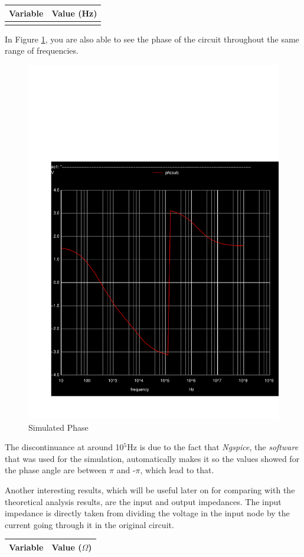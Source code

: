 \begin{center}
\begin{tabular}{|l|r|}
  \hline    
  {\bf Variable} & {\bf Value (Hz)} \\ \hline
  
  \label{tab:freq-tab}
\end{tabular}
\end{center}

In Figure \ref{fig:sim-phase}, you are also able to see the phase of the circuit throughout the same range of frequencies.

\begin{figure}[H] \centering
\includegraphics[width=0.5\linewidth]{../sim/phase.pdf}
\caption{Simulated Phase}
\label{fig:sim-phase}
\end{figure}

The discontinuance at around 10$^5$Hz is due to the fact that \textit{Ngspice}, the \textit{software} that was used for the simulation, automatically makes it so the values showed for the phase angle are between $\pi$ and -$\pi$, which lead to that. 

Another interesting results, which will be useful later on for comparing with the theoretical analysis results, are the input and output impedances. The input impedance is directly taken from dividing the voltage in the input node by the current going through it in the original circuit.

\begin{center}
\begin{tabular}{|l|r|}
  \hline    
  {\bf Variable} & {\bf Value ($\Omega$)} \\ \hline
  
\end{tabular}
\end{center}

